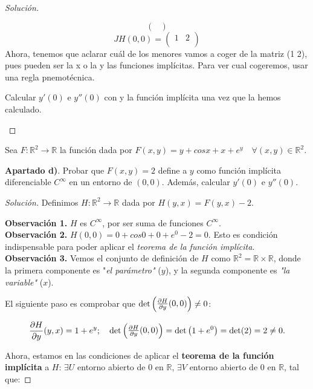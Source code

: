 \begin{proof}[Solución]
\begin{nlist}
\[\begin{pmatrix}
\end{pmatrix}
\]
\[
JH(0,0)= \begin{pmatrix}
 1 & 2 \\
\end{pmatrix}
\]
Ahora, tenemos que aclarar cuál de los menores vamos a coger de la matriz (1   2), pues pueden ser la x o la y las funciones implícitas. Para ver cual cogeremos, usar una regla pnemotécnica.

Calcular $y'(0)$ e $y''(0)$ con y la función implícita una vez que la hemos calculado.
\end{nlist}
\end{proof}

\begin{ejer}
Sea $F:\mathbb{R}^2 \longrightarrow \mathbb{R}$ la función dada por $F(x,y) = y + cosx + x + e^y \quad \forall(x,y)\in \mathbb{R}^2$.

\textbf{Apartado d)}. Probar que $F(x,y)=2$ define a $y$ como función implícita diferenciable $C^{\infty}$ en un entorno de $(0,0)$. Además, calcular $y'(0)$ e $y''(0)$.

\begin{proof}[Solución]
Definimos $H:\mathbb{R}^2 \longrightarrow \mathbb{R}$ dada por $H(y,x)=F(y,x)-2$.

\textbf{Observación 1.} $H$ es $C^{\infty}$, por ser suma de funciones $C^{\infty}$.\\
\textbf{Observación 2.} $H(0,0) = 0 + cos0 + 0 + e^0 - 2 = 0$. Esto es condición indispensable para poder aplicar el \textit{teorema de la función implícita}.\\
\textbf{Observación 3.} Vemos el conjunto de definición de $H$ como $\mathbb{R}^2 = \mathbb{R} \times \mathbb{R}$, donde la primera componente es "\textit{el parámetro"} ($y$), y la segunda componente es \textit{"la variable"} ($x$).

El siguiente paso es comprobar que $\displaystyle \det \begin{pmatrix}
	\pder[H]{y}(0,0)\\
\end{pmatrix} \ne 0$:

$$\pder[H]{y}(y,x) = 1 + e^y;\quad \det \begin{pmatrix}
	\pder[H]{y}(0,0)\\
\end{pmatrix} = \det \left( 1 + e^0 \right) = \det (2) = 2 \ne 0.$$

Ahora, estamos en las condiciones de aplicar el \textbf{teorema de la función implícita} a $H$:
$\exists U$ entorno abierto de $0$ en $\mathbb{R}$, $\exists V$ entorno abierto de $0$ en $\mathbb{R}$, tal que:


\end{proof}
\end{ejer}
